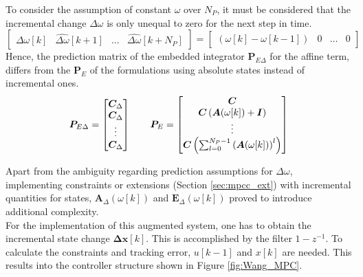 To consider the assumption of constant $\omega$ over $N_P$, it must be considered that the incremental change $\Delta\omega$ is only unequal to zero for the next step in time. 
\[
\begin{bmatrix}
    \Delta\omega[k] & \hat{\Delta\omega}[k+1] & \hdots & \hat{\Delta\omega}[k+N_P] 
\end{bmatrix}
 = 
 \begin{bmatrix}
     \left(\omega[k] -\omega[k-1]\right) & 0 & \hdots & 0
 \end{bmatrix}
\]
Hence, the prediction matrix of the embedded integrator $\bm{P}_{E\Delta} $ for the affine term, differs from the $\bm{P}_E$ of the formulations using absolute states instead of incremental ones.
\begin{align*}
    \bm{P}_{E\Delta} =  
	\begin{bmatrix}
	\bm{C}_{\Delta} \\
	\bm{C}_{\Delta} \\
	\vdots \\
	\bm{C}_{\Delta} \\
	\end{bmatrix}
     \quad \quad
    \bm{P}_E = 
	\begin{bmatrix}
		\bm{C} \\
		\bm{C}\left(\bm{A}(\omega[k]) + \bm{I} \right) \\
		\vdots \\
		\bm{C} \left( \sum_{l=0}^{N_P-1} \left(\bm{A}(\omega[k]) \right)^l \right) 
	\end{bmatrix}
\end{align*}

Apart from the ambiguity regarding prediction assumptions for ${{\Delta \omega}}$, implementing constraints or extensions (Section \ref{sec:mpcc_ext}) with incremental quantities for states, ${\bm{A}_{\Delta}(\omega[k])}$ and ${\bm{E}_{\Delta}(\omega[k])}$ proved to introduce additional complexity.\\
For the implementation of this augmented system, one has to obtain the incremental state change $\bm{\Delta x} [k] $. This is accomplished by the filter $1-z^{-1}$. To calculate the constraints and tracking error, $u[k-1]$ and $x[k]$ are needed. This results into the controller structure shown in Figure \ref{fig:Wang_MPC}.
